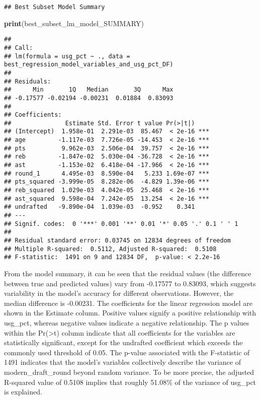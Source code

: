 \documentclass[
]{article}
\newenvironment{Shaded}{\begin{snugshade}}{\end{snugshade}}
\newcommand{\FunctionTok}[1]{\textcolor[rgb]{0.13,0.29,0.53}{\textbf{#1}}}
\newcommand{\NormalTok}[1]{#1}
\begin{document}
\begin{verbatim}
## Best Subset Model Summary
\end{verbatim}

\begin{Shaded}
\begin{Highlighting}[]
\FunctionTok{print}\NormalTok{(best\_subset\_lm\_model\_SUMMARY)}
\end{Highlighting}
\end{Shaded}

\begin{verbatim}
## 
## Call:
## lm(formula = usg_pct ~ ., data = best_regression_model_variables_and_usg_pct_DF)
## 
## Residuals:
##      Min       1Q   Median       3Q      Max 
## -0.17577 -0.02194 -0.00231  0.01884  0.83093 
## 
## Coefficients:
##               Estimate Std. Error t value Pr(>|t|)    
## (Intercept)  1.958e-01  2.291e-03  85.467  < 2e-16 ***
## age         -1.117e-03  7.726e-05 -14.453  < 2e-16 ***
## pts          9.962e-03  2.506e-04  39.757  < 2e-16 ***
## reb         -1.847e-02  5.030e-04 -36.728  < 2e-16 ***
## ast         -1.153e-02  6.418e-04 -17.966  < 2e-16 ***
## round_1      4.495e-03  8.590e-04   5.233 1.69e-07 ***
## pts_squared -3.999e-05  8.282e-06  -4.829 1.39e-06 ***
## reb_squared  1.029e-03  4.042e-05  25.468  < 2e-16 ***
## ast_squared  9.598e-04  7.242e-05  13.254  < 2e-16 ***
## undrafted   -9.890e-04  1.039e-03  -0.952    0.341    
## ---
## Signif. codes:  0 '***' 0.001 '**' 0.01 '*' 0.05 '.' 0.1 ' ' 1
## 
## Residual standard error: 0.03745 on 12834 degrees of freedom
## Multiple R-squared:  0.5112, Adjusted R-squared:  0.5108 
## F-statistic:  1491 on 9 and 12834 DF,  p-value: < 2.2e-16
\end{verbatim}

From the model summary, it can be seen that the residual values (the
difference between true and predicted values) vary from -0.17577 to
0.83093, which suggests variability in the model's accuracy for
different observations. However, the median difference is -0.00231. The
coefficients for the linear regression model are shown in the Estimate
column. Positive values signify a positive relationship with usg\_pct,
whereas negative values indicate a negative relationship. The p values
within the Pr(\textgreater\textbar t\textbar) column indicate that all
coefficients for the variables are statistically significant, except for
the undrafted coefficient which exceeds the commonly used threshold of
0.05. The p-value associated with the F-statistic of 1491 indicates that
the model's variables collectively describe the variance of
modern\_draft\_round beyond random variance. To be more precise, the
adjusted R-squared value of 0.5108 implies that roughly 51.08\% of the
variance of usg\_pct is explained.
\end{document}
